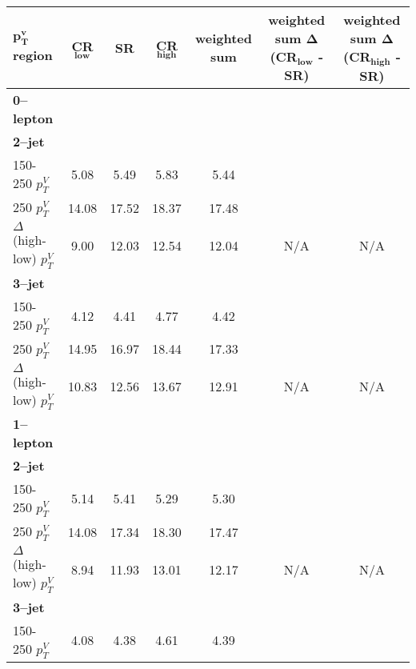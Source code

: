 \begin{table}[!htb]
  \centering
  \begin{tabular}{lS[table-format=3.2]S[table-format=3.2]S[table-format=3.2]S[table-format=3.2]S[table-format=3.2]S[table-format=3.2]}
    \toprule
    {\bfseries $\bm{p_T^v}$ region} & {\bfseries CR$\bm{_{\text{low}}}$} & {\bfseries SR} & {\bfseries CR$\bm{_{high}}$} & {\bfseries weighted sum} & {\bfseries weighted sum $\bm{\Delta}$(CR$\bm{_{\text{low}}}$ - SR)}  & {\bfseries weighted sum $\bm{\Delta}$(CR$\bm{_{high}}$ - SR)} \\
    \midrule
    {\bfseries 0--lepton}& & & & & & \\
    {\bfseries 2--jet} & & & & & & \\
    150-250 $p_T^V$ & 5.08       & 5.49    & 5.83         & 5.44    &   {} & {} \\
    250 $p_T^V$                  & 14.08      & 17.52  & 18.37        & 17.48    &         &           \\
    $\Delta$(high-low) $p_T^V$   & 9.00       & 12.03  & 12.54        & 12.04    &    N/A      &     N/A \\
    {\bfseries 3--jet} & & & & & & \\
    150-250 $p_T^V$              & 4.12       & 4.41    & 4.77         & 4.42     &   {} & {} \\
    250 $p_T^V$                  & 14.95      & 16.97   & 18.44        & 17.33    &          &            \\
    $\Delta$(high-low) $p_T^V$   & 10.83      & 12.56   & 13.67        & 12.91    &    N/A      &  N/A     \\
    {\bfseries 1--lepton} & & & & & & \\
    {\bfseries 2--jet} & & & & & &  \\
    150-250 $p_T^V$              & 5.14  & 5.41  & 5.29  & 5.30  &   {} &  {} \\
    250 $p_T^V$                  & 14.08 & 17.34 & 18.30 & 17.47 &               &         \\
    $\Delta$(high-low) $p_T^V$   & 8.94  & 11.93 & 13.01 & 12.17 &      N/A         &   N/A  \\
    {\bfseries 3--jet} & & & & & & \\
    150-250 $p_T^V$              & 4.08  & 4.38  & 4.61  & 4.39  &    {}     & {} \\ 

\end{tabular}
\end{table}
